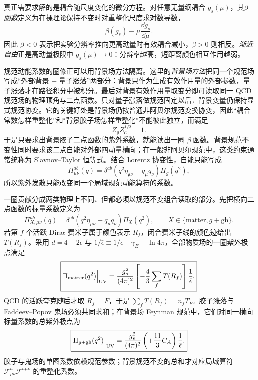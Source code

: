 真正需要求解的是耦合随尺度变化的微分方程。对任意无量纲耦合 $g_s(\mu)$，其\emph{$\beta$ 函数}定义为在裸理论保持不变时对重整化尺度求对数导数，
\begin{equation*}
 \beta(g_s)\equiv\mu\frac{\dd g_s}{\dd\mu}.
\end{equation*}
因此 $\beta<0$ 表示把实验分辨率推向更高动量时有效耦合减小，$\beta>0$ 则相反。\emph{渐近自由}正是高动量极限中 $g_s(\mu)\to0$：分辨率越高，短距离颜色相互作用越弱。

规范动能系数的圈修正可以用背景场方法隔离。这里的\emph{背景场方法}把同一个规范场写成“外部背景 + 量子涨落”两部分：背景只作为生成有效作用量的外部参数，量子涨落才在路径积分中被积分。最后对背景有效作用量取变分即可读取同一 QCD 规范场的物理顶角与二点函数。只对量子涨落做规范固定以后，背景变量仍保持显式规范协变。它的关键好处是背景场仍按普通非阿贝尔规范变换协变，因此“耦合常数怎样重整化”和“背景胶子场怎样重整化”不能彼此独立，而满足
\begin{equation}
 \boxed{Z_g Z_{\mathscr C}^{1/2}=1.}
 \label{eq:qcd-background-field-Zrelation-dp10}
\end{equation}
于是只要求出背景胶子二点函数的紫外系数，就能读出一圈 $\beta$ 函数。背景规范不变性同时要求该二点自能对外部四动量横向；在一般非阿贝尔规范中，这类约束通常统称为 Slavnov--Taylor 恒等式。结合 Lorentz 协变性，自能只能写成
\begin{equation*}
 \Pi_{\mu\nu}^{ab}(q)
 =\delta^{ab}(q^2\eta_{\mu\nu}-q_\mu q_\nu)\Pi_g(q^2),
\end{equation*}
所以紫外发散只能改变同一个局域规范动能算符的系数。

一圈贡献分成两类物理上不同、但都必须以规范不变组合读取的部分。先把横向二点函数的标量系数定义为
\begin{equation*}
 \Pi_{X,\mu\nu}^{ab}(q)
 =\delta^{ab}(q^2\eta_{\mu\nu}-q_\mu q_\nu)\Pi_X(q^2),
 \qquad X\in\{\mathrm{matter},g+\mathrm{gh}\}.
\end{equation*}
若第 $f$ 个活跃 Dirac 费米子属于颜色表示 $R_f$，闭合费米子线的颜色迹给出 $T(R_f)$。采用 $d=4-2\epsilon$ 与 $1/\bar\epsilon\equiv1/\epsilon-\gamma_E+\ln4\pi$，全部物质场的一圈紫外极点满足
\begin{equation}
 \boxed{
 \Pi_{\rm matter}(q^2)\Big|_{\rm UV}
 =\frac{g_s^2}{(4\pi)^2}
 \left[-\frac{4}{3}\sum_fT(R_f)\right]
 \frac1{\bar\epsilon}.}
 \label{eq:qcd-quark-loop-uv-coefficient-dp10}
\end{equation}
QCD 的活跃夸克随后才取 $R_f=F$，于是 $\sum_fT(R_f)=n_fT_F$。胶子涨落与 Faddeev--Popov 鬼场必须共同求和；在背景场 Feynman 规范中，它们对同一横向标量系数的总紫外极点为
\begin{equation}
 \boxed{
 \Pi_{g+\rm gh}(q^2)\Big|_{\rm UV}
 =\frac{g_s^2}{(4\pi)^2}
 \left(+\frac{11}{3}C_A\right)
 \frac1{\bar\epsilon}.}
 \label{eq:qcd-glue-ghost-uv-coefficient-dp10}
\end{equation}
胶子与鬼场的单图系数依赖规范参数；背景规范不变的总和才对应局域算符 $\mathcal F_{\mu\nu}^a\mathcal F^{a\mu\nu}$ 的重整化系数。

